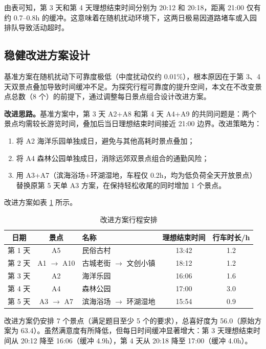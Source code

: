 由表可知，第 3 天和第 4 天理想结束时间分别为 20:12 和 20:18，距离 21:00 仅有约 0.7--0.8h 的缓冲。这意味着在随机扰动环境下，这两日极易因道路堵车或入园排队导致活动超时。


\subsection{稳健改进方案设计}

基准方案在随机扰动下可靠度极低（中度扰动仅约 0.01\%），根本原因在于第 3、4 天双景点叠加导致时间缓冲不足。为探究行程可靠度的提升空间，本文在不改变景点总数（8 个）的前提下，通过调整每日景点组合设计改进方案。

\textbf{改进思路。}基准方案中，第 3 天 A2+A8 和第 4 天 A4+A9 的共同问题是：两个景点均需较长游览时间，叠加后当日理想结束时间接近 21:00 边界。改进策略为：
\begin{enumerate}[label=(\arabic*)]
    \item 将 A2 海洋乐园单独成日，避免与其他高耗时景点叠加；
    \item 将 A4 森林公园单独成日，消除远郊双景点组合的通勤风险；
    \item 用 A3+A7（滨海浴场+环湖湿地，车程仅 0.2h，均为低负荷全天开放景点）替换原第 5 天单 A3 方案，在保持轻松收尾的同时增加 1 个景点。
\end{enumerate}

改进方案如表 \ref{tab:improved} 所示。

\begin{table}[H]
\centering
\caption{改进方案行程安排}
\label{tab:improved}
\begin{tabular}{ccp{3.5cm}cc}
\toprule
日期 & 景点 & 名称 & 理想结束时间 & 行车时长/h \\
\midrule
第 1 天 & A5 & 民俗古村 & 13:42 & 1.2 \\
第 2 天 & A1 $\rightarrow$ A10 & 古城老街 $\rightarrow$ 文创小镇 & 18:12 & 1.2 \\
第 3 天 & A2 & 海洋乐园 & 16:06 & 1.6 \\
第 4 天 & A4 & 森林公园 & 17:00 & 3.0 \\
第 5 天 & A3 $\rightarrow$ A7 & 滨海浴场 $\rightarrow$ 环湖湿地 & 15:54 & 0.9 \\
\bottomrule
\end{tabular}
\end{table}

改进方案仍安排 7 个景点（满足题目至少 5 个的要求），总喜好度为 56.0（原始方案为 63.4）。虽然满意度有所降低，但每日时间缓冲显著增大：第 3 天理想结束时间从 20:12 降至 16:06（缓冲 4.9h），第 4 天从 20:18 降至 17:00（缓冲 4.0h）。


